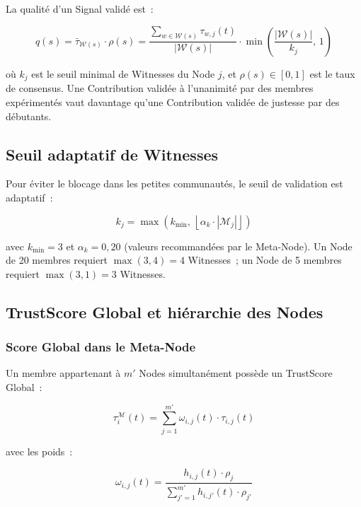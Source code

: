 \documentclass[12pt,a4paper]{article}
\theoremstyle{definition}
\theoremstyle{plain}
\theoremstyle{remark}
\newcommand{\trustscore}{\tau}
\newcommand{\1}{\mathbf{1}}
\begin{document}
La qualité d'un Signal validé est~:

\begin{equation}
q(s) = \bar{\trustscore}_{\mathcal{W}(s)} \cdot \rho(s)
= \frac{\sum_{w \in \mathcal{W}(s)} \trustscore_{w,j}(t)}{|\mathcal{W}(s)|}
\cdot \min\!\left(\frac{|\mathcal{W}(s)|}{k_j},\, 1\right)
\label{eq:quality}
\end{equation}

où $k_j$ est le seuil minimal de Witnesses du Node $j$, et $\rho(s) \in [0,1]$
est le taux de consensus. Une Contribution validée à l'unanimité par des
membres expérimentés vaut davantage qu'une Contribution validée de justesse par
des débutants.

\subsection{Seuil adaptatif de Witnesses}

Pour éviter le blocage dans les petites communautés, le seuil de validation est
adaptatif~:

\begin{equation}
k_j = \max\!\left(k_{\min},\, \left\lfloor \alpha_k \cdot |\mathcal{M}_j| \right\rfloor\right)
\label{eq:k}
\end{equation}

avec $k_{\min} = 3$ et $\alpha_k = 0{,}20$ (valeurs recommandées par le
Meta-Node). Un Node de 20 membres requiert $\max(3, 4) = 4$ Witnesses~; un
Node de 5 membres requiert $\max(3, 1) = 3$ Witnesses.

\subsection{TrustScore Global et hiérarchie des Nodes}

\subsubsection{Score Global dans le Meta-Node}

Un membre appartenant à $m'$ Nodes simultanément possède un TrustScore Global~:

\begin{equation}
\trustscore_i^{\mathcal{M}}(t)
= \sum_{j=1}^{m'} \omega_{i,j}(t) \cdot \trustscore_{i,j}(t)
\label{eq:global}
\end{equation}

avec les poids~:

\begin{equation}
\omega_{i,j}(t) = \frac{h_{i,j}(t) \cdot \rho_j}{\displaystyle\sum_{j'=1}^{m'} h_{i,j'}(t) \cdot \rho_{j'}}
\label{eq:omega}
\end{equation}
\end{document}
